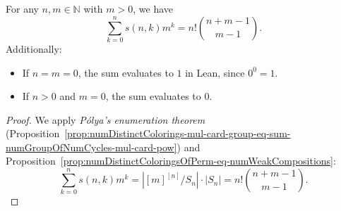 \begin{proposition}
  \label{prop:sum-stirlingFirstKind-mul-pow-eq-choose-mul-factorial}
  \leanok
  For any $n, m \in \mathbb{N}$ with $m > 0$, we have
  \begin{equation*}
    \sum_{k = 0}^n s(n, k) m^k = n! \binom{n + m - 1}{m - 1}.
  \end{equation*}
  Additionally:
  \begin{itemize}
    \item If $n = m = 0$, the sum evaluates to $1$ in Lean, since $0^0 = 1$.
    \item If $n > 0$ and $m = 0$, the sum evaluates to $0$.
  \end{itemize}
\end{proposition}

\begin{proof}
  \leanok
  We apply \emph{Pólya's enumeration theorem} (Proposition~\ref{prop:numDistinctColorings-mul-card-group-eq-sum-numGroupOfNumCycles-mul-card-pow}) and Proposition~\ref{prop:numDistinctColoringsOfPerm-eq-numWeakCompositions}:
  \begin{equation*}
    \sum_{k = 0}^n s(n, k) m^k = |[m]^{[n]}/S_n| \cdot |S_n| = n! \binom{n + m - 1}{m - 1}.
  \end{equation*}
\end{proof}
